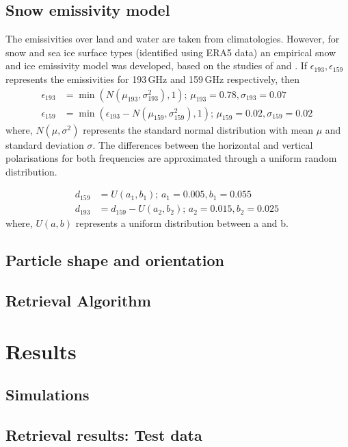 \documentclass[amt, manuscript]{copernicus}
\begin{document}
\subsection{Snow emissivity model}
The emissivities over land and water are taken from climatologies. However, for
snow and sea ice surface types (identified using ERA5 data) an empirical snow
and ice emissivity model was developed, based on the studies of
\citet{harlow:2009:milli, harlow:2012:tundr} and \citet{hewison:2002:airbo}. If
$\epsilon_{193}, \epsilon_{159}$ represents the emissivities for 193\,GHz and
159\,GHz respectively, then
\begin{align}
\epsilon_{193}& = \min({N(\mu_{193}, \sigma_{193}^{2}), 1});\, \mu_{193} = 0.78, \sigma_{193} = 0.07 \label{eq:1}\\
\epsilon_{159}& = \min(\epsilon_{193} - N(\mu_{159}, \sigma_{159}^{2}), 1) ;\,  \mu_{159} = 0.02, \sigma_{159} = 0.02\,\label{eq:2}
\end{align}
where, $N(\mu, \sigma^{2})$ represents the standard normal distribution with
mean $\mu$ and standard deviation $\sigma$. The differences between the
horizontal and vertical polarisations for both frequencies are 
approximated through a uniform random distribution.

\begin{align}
d_{159}& = U(a_1, b_1) ;\, a_1 = 0.005, b_1 = 0.055\\
d_{193}& = d_{159} - U(a_2, b_2) ;\, a_2 = 0.015, b_2 = 0.025 \,
\end{align}
where, $U(a, b)$ represents a uniform distribution between a and b. 

\subsection{Particle shape and orientation}

\subsection{Retrieval Algorithm}

\section{Results}
\subsection{Simulations}

\subsection{Retrieval results: Test data}
\end{document}
